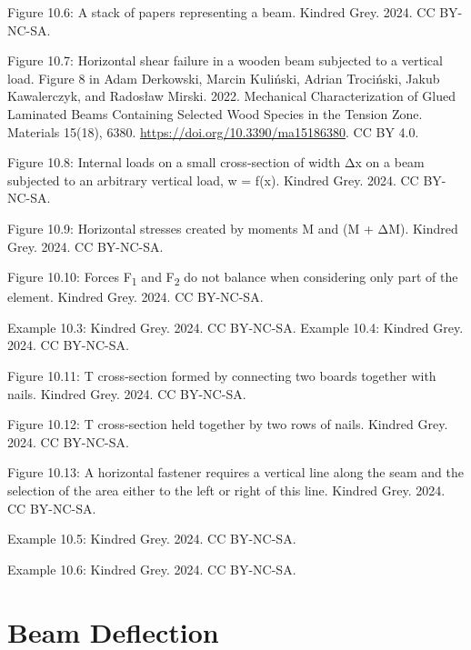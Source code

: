 \documentclass[
  letterpaper,
  DIV=11,
  numbers=noendperiod]{scrreprt}
\theoremstyle{definition}
\theoremstyle{remark}
\begin{document}
Figure 10.6: A stack of papers representing a beam. Kindred Grey. 2024.
CC BY-NC-SA.

Figure 10.7: Horizontal shear failure in a wooden beam subjected to a
vertical load. Figure 8 in Adam Derkowski, Marcin Kuliński, Adrian
Trociński, Jakub Kawalerczyk, and Radosław Mirski. 2022. Mechanical
Characterization of Glued Laminated Beams Containing Selected Wood
Species in the Tension Zone. Materials 15(18), 6380.
\url{https://doi.org/10.3390/ma15186380}. CC BY 4.0.

Figure 10.8: Internal loads on a small cross-section of width Δx on a
beam subjected to an arbitrary vertical load, w = f(x). Kindred Grey.
2024. CC BY-NC-SA.

Figure 10.9: Horizontal stresses created by moments M and (M + ΔM).
Kindred Grey. 2024. CC BY-NC-SA.

Figure 10.10: Forces F\textsubscript{1} and F\textsubscript{2} do not
balance when considering only part of the element. Kindred Grey. 2024.
CC BY-NC-SA.

Example 10.3: Kindred Grey. 2024. CC BY-NC-SA. Example 10.4: Kindred
Grey. 2024. CC BY-NC-SA.

Figure 10.11: T cross-section formed by connecting two boards together
with nails. Kindred Grey. 2024. CC BY-NC-SA.

Figure 10.12: T cross-section held together by two rows of nails.
Kindred Grey. 2024. CC BY-NC-SA.

Figure 10.13: A horizontal fastener requires a vertical line along the
seam and the selection of the area either to the left or right of this
line. Kindred Grey. 2024. CC BY-NC-SA.

Example 10.5: Kindred Grey. 2024. CC BY-NC-SA.

Example 10.6: Kindred Grey. 2024. CC BY-NC-SA.


\chapter{Beam Deflection}\label{sec-beam-deflection}
\end{document}
